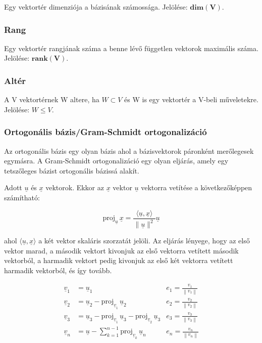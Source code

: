 \documentclass{article}
\begin{document}
Egy vektortér dimenziója a bázisának számossága. Jelölése: $\mathbf{dim(V)}$.

\subsubsection{Rang}

Egy vektortér rangjának száma a benne lévő független vektorok maximális száma. Jelölése: $\mathbf{rank(V)}$.

\subsubsection{Altér} 

A V vektortérnek W altere, ha $W \subset V$ és W is egy vektortér a V-beli mű\-ve\-le\-te\-kre. Jelölése: $W \leq V$.

\newpage

\subsubsection{Ortogonális bázis/Gram-Schmidt ortogonalizáció}

Az ortogonális bázis egy olyan bázis ahol a bázisvektorok páronként me\-rő\-le\-ges\-ek egy\-más\-ra. A Gram-Schmidt ortogonalizáció egy olyan eljárás, amely egy tetszőleges bázist ortogonális bázissá alakít.

Adott $\underline{u}$ és $\underline{x}$ vektorok. Ekkor az $\underline{x}$ vektor $\underline{u}$ vektorra vetítése a kö\-vet\-ke\-ző\-kép\-pen számítható:

\[
\mathrm{proj}_{\underline{u}}\,\underline{x} =\frac{\langle \underline{u} ,\underline{x} \rangle}{\|\underline{u}\|^2} \underline{u}
\]

ahol $\langle \underline{u} ,\underline{x} \rangle$ a két vektor skaláris szorzatát jelöli. 
\vspace{4mm}
\newline Az eljárás lényege, hogy az első vektor marad, a második vektort kivonjuk az első vektorra vetített második vektorból, a harmadik vektort pedig kivonjuk az első két vektorra vetített harmadik vektorból, és így tovább.

\begin{align*}
    \underline{v}_1 &= \underline{u}_1 & e_1 = \frac{v_1}{\left\lVert v_1\right\rVert}\\
    \underline{v}_2 &= \underline{u}_2 - \mathrm{proj}_{\underline{v}_1}\,\underline{u}_2 & e_2 = \frac{v_2}{\left\lVert v_2\right\rVert}\\
    \underline{v}_3 &= \underline{u}_3 - \mathrm{proj}_{\underline{v}_1}\,\underline{u}_3 - \mathrm{proj}_{\underline{v}_2}\,\underline{u}_3 & e_3 = \frac{v_3}{\left\lVert v_3\right\rVert}\\
    \underline{v}_n &= \underline{u} - \sum_{k = 1}^{n-1} \mathrm{proj}_{\underline{v}_k}\,\underline{u}_n & e_n = \frac{v_n}{\left\lVert v_n\right\rVert}
\end{align*}
\end{document}
